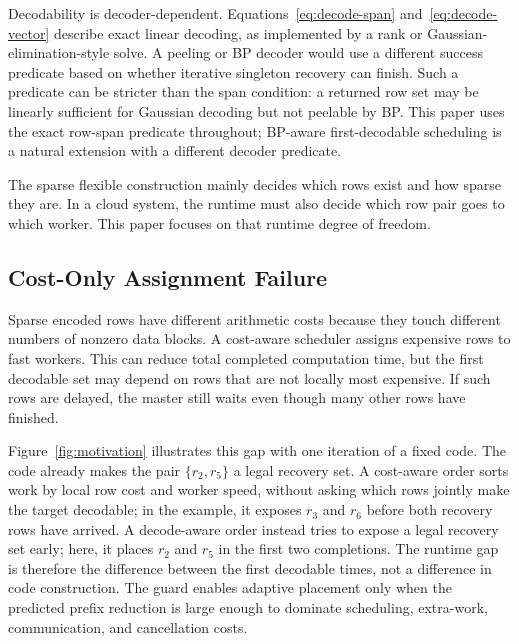 Decodability is decoder-dependent.  Equations~\eqref{eq:decode-span}
and~\eqref{eq:decode-vector} describe exact linear decoding, as implemented by
a rank or Gaussian-elimination-style solve.  A peeling or BP decoder would use a
different success predicate based on whether iterative singleton recovery can
finish.  Such a predicate can be stricter than the span condition: a returned
row set may be linearly sufficient for Gaussian decoding but not peelable by
BP.  This paper uses the exact row-span predicate throughout; BP-aware
first-decodable scheduling is a natural extension with a different decoder
predicate.

The sparse flexible construction mainly decides which rows exist and how sparse
they are.  In a cloud system, the runtime must also decide which row pair goes
to which worker.  This paper focuses on that runtime degree of freedom.

\subsection{Cost-Only Assignment Failure}
\label{sec:motivation}

Sparse encoded rows have different arithmetic costs because they touch
different numbers of nonzero data blocks.  A cost-aware scheduler assigns
expensive rows to fast workers.  This can reduce total completed computation
time, but the first decodable set may depend on rows that are not locally most
expensive.  If such rows are delayed, the master still waits even though many
other rows have finished.

Figure~\ref{fig:motivation} illustrates this gap with one iteration of a fixed
code.  The code already makes the pair $\{r_2,r_5\}$ a legal recovery set.  A
cost-aware order sorts work by local row cost and worker speed, without asking
which rows jointly make the target decodable; in the example, it exposes
$r_3$ and $r_6$ before both recovery rows have arrived.  A decode-aware order
instead tries to expose a legal recovery set early; here, it places $r_2$ and
$r_5$ in the first two completions.  The runtime gap is therefore the
difference between the first decodable times, not a difference in code
construction.  The guard enables adaptive placement only when the predicted
prefix reduction is large enough to dominate scheduling, extra-work,
communication, and cancellation costs.

